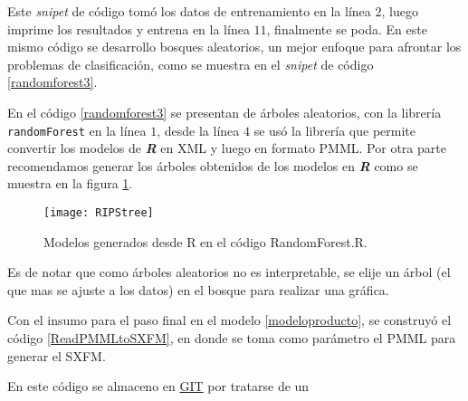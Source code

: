   
 
 Este \textit{snipet} de código  tomó los datos de entrenamiento en la línea $2$, luego imprime los resultados y entrena en la línea $11$, finalmente se poda.  En este mismo código se desarrollo  bosques aleatorios, un mejor enfoque para afrontar los problemas de clasificación\cite{Hastie2009,Caruana2006}, como se muestra en el \textit{snipet} de código \ref{randomforest3}.
 
 
 
 En el código \ref{randomforest3} se presentan de árboles aleatorios, con la librería \texttt{randomForest} en la línea $1$,  desde la línea $4$ se usó la librería que permite convertir los modelos de \textbf{\textit{R}} en XML y luego en formato PMML.
 Por otra parte recomendamos generar los árboles obtenidos de los modelos en \textbf{\textit{R}} como se muestra en la figura \ref{RIPStree}.

\begin{figure}[h]
	\centering
	\texttt{[image: RIPStree]}
	\caption{Modelos generados desde R en el código RandomForest.R.}
	\label{RIPStree}
\end{figure}
 
 Es de notar que como árboles aleatorios no es interpretable, se elije un árbol (el que mas se ajuste a los datos) en el bosque para realizar una gráfica.
 
Con el insumo para el paso final en el modelo \ref{modeloproducto}, se construyó el código \ref{ReadPMMLtoSXFM},  en donde se toma como parámetro el PMML para generar el SXFM.

 
 
  En este código se almaceno en \href{https://github.com/josepplloo/tamarindo}{GIT} por tratarse de un 
 
 
